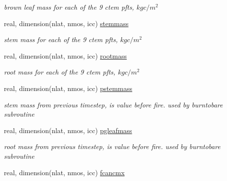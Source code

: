 \begin{DoxyCompactItemize}
\begin{DoxyCompactList}\small\item\em brown leaf mass for each of the 9 ctem pfts, $kg c/m^2$ \end{DoxyCompactList}\item 
\hypertarget{structctem__statevars_1_1veg__rot_afbd8e5d292b557b510fe28c8c99d07d2}{}real, dimension(nlat, nmos, icc) \hyperlink{structctem__statevars_1_1veg__rot_afbd8e5d292b557b510fe28c8c99d07d2}{stemmass}\label{structctem__statevars_1_1veg__rot_afbd8e5d292b557b510fe28c8c99d07d2}

\begin{DoxyCompactList}\small\item\em stem mass for each of the 9 ctem pfts, $kg c/m^2$ \end{DoxyCompactList}\item 
\hypertarget{structctem__statevars_1_1veg__rot_aaccbeed2d705608978ec85ce9fc61728}{}real, dimension(nlat, nmos, icc) \hyperlink{structctem__statevars_1_1veg__rot_aaccbeed2d705608978ec85ce9fc61728}{rootmass}\label{structctem__statevars_1_1veg__rot_aaccbeed2d705608978ec85ce9fc61728}

\begin{DoxyCompactList}\small\item\em root mass for each of the 9 ctem pfts, $kg c/m^2$ \end{DoxyCompactList}\item 
\hypertarget{structctem__statevars_1_1veg__rot_afe058c943c402258bb9b46cec0e30ef0}{}real, dimension(nlat, nmos, icc) \hyperlink{structctem__statevars_1_1veg__rot_afe058c943c402258bb9b46cec0e30ef0}{pstemmass}\label{structctem__statevars_1_1veg__rot_afe058c943c402258bb9b46cec0e30ef0}

\begin{DoxyCompactList}\small\item\em stem mass from previous timestep, is value before fire. used by burntobare subroutine \end{DoxyCompactList}\item 
\hypertarget{structctem__statevars_1_1veg__rot_a60db22444cb53206058729119b00b5cb}{}real, dimension(nlat, nmos, icc) \hyperlink{structctem__statevars_1_1veg__rot_a60db22444cb53206058729119b00b5cb}{pgleafmass}\label{structctem__statevars_1_1veg__rot_a60db22444cb53206058729119b00b5cb}

\begin{DoxyCompactList}\small\item\em root mass from previous timestep, is value before fire. used by burntobare subroutine \end{DoxyCompactList}\item 
\hypertarget{structctem__statevars_1_1veg__rot_a1d4e05a2988dca54d11bdbf812d7ba8d}{}real, dimension(nlat, nmos, icc) \hyperlink{structctem__statevars_1_1veg__rot_a1d4e05a2988dca54d11bdbf812d7ba8d}{fcancmx}\label{structctem__statevars_1_1veg__rot_a1d4e05a2988dca54d11bdbf812d7ba8d}


\end{DoxyCompactItemize}
